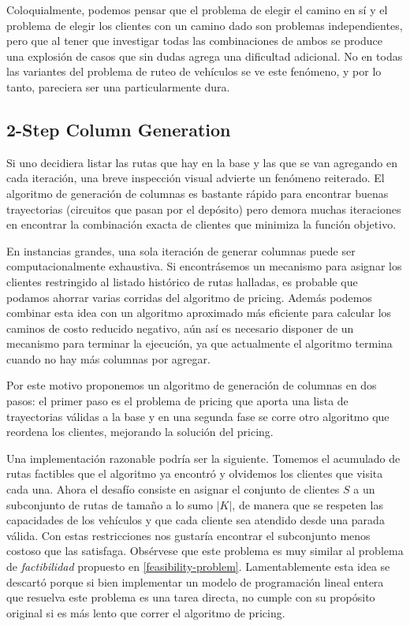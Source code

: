 Coloquialmente, podemos pensar que el problema de elegir el camino en sí y el problema de elegir los clientes con un camino dado son problemas independientes, pero que al tener que investigar todas las combinaciones de ambos se produce una explosión de casos que sin dudas agrega una dificultad adicional. No en todas las variantes del problema de ruteo de vehículos se ve este fenómeno, y por lo tanto,  pareciera ser una particularmente dura. 

\subsection{2-Step Column Generation}
\label{section:2-step-cg}

Si uno decidiera listar las rutas que hay en la base y las que se van agregando en cada iteración, una breve inspección visual advierte un fenómeno reiterado. El algoritmo de generación de columnas es bastante rápido para encontrar buenas trayectorias (circuitos que pasan por el depósito) pero demora muchas iteraciones en encontrar la combinación exacta de clientes que minimiza la función objetivo.  

En instancias grandes, una sola iteración de generar columnas puede ser com\-putacionalmente exhaustiva. Si encontrásemos un mecanismo para asignar los clientes restringido al listado histórico de rutas halladas, es probable que podamos ahorrar varias corridas del algoritmo de pricing. Además podemos combinar esta idea con un algoritmo aproximado más eficiente para calcular los caminos de costo reducido negativo, aún así es necesario disponer de un mecanismo para terminar la ejecución, ya que actualmente el algoritmo termina cuando no hay más columnas por agregar.

Por este motivo proponemos un algoritmo de generación de columnas en dos pasos: el primer paso es el problema de pricing que aporta una lista de trayectorias válidas a la base y en una segunda fase se corre otro algoritmo que reordena los clientes, mejorando la solución del pricing.

Una implementación razonable podría ser la siguiente. Tomemos el acumulado de rutas factibles que el algoritmo ya encontró y olvidemos los clientes que visita cada una. Ahora el desafío consiste en asignar el conjunto de clientes $S$ a un subconjunto de rutas de tamaño a lo sumo $|K|$, de manera que se respeten las capacidades de los vehículos y que cada cliente sea atendido desde una parada válida. Con estas restricciones nos gustaría encontrar el subconjunto menos costoso que las satisfaga. Obsérvese que este problema es muy similar al problema de \emph{factibilidad} propuesto en \ref{feasibility-problem}. Lamentablemente esta idea se descartó porque si bien implementar un modelo de programación lineal entera que resuelva este problema es una tarea directa, no cumple con su propósito original si es más lento que correr el algoritmo de pricing. 

